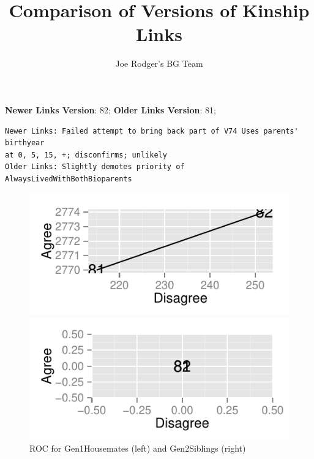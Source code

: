 \documentclass[a4paper]{article}\usepackage[]{graphicx}\usepackage[]{color}
\title{Comparison of Versions of Kinship Links}
\author{Joe Rodger's BG Team}
\makeatletter
\def\maxwidth{ %
  \ifdim\Gin@nat@width>\linewidth
    \linewidth
  \else
    \Gin@nat@width
  \fi
}
\newenvironment{kframe}{%
 \def\at@end@of@kframe{}%
 \ifinner\ifhmode%
  \def\at@end@of@kframe{\end{minipage}}%
  \begin{minipage}{\columnwidth}%
 \fi\fi%
 \def\FrameCommand##1{\hskip\@totalleftmargin \hskip-\fboxsep
 \colorbox{shadecolor}{##1}\hskip-\fboxsep
     \hskip-\linewidth \hskip-\@totalleftmargin \hskip\columnwidth}%
 \MakeFramed {\advance\hsize-\width
   \@totalleftmargin\z@ \linewidth\hsize
   \@setminipage}}%
 {\par\unskip\endMakeFramed%
 \at@end@of@kframe}
\newenvironment{knitrout}{}{} %
\makeatother
\begin{document}
\maketitle

\setlength{\parindent}{0pt}%







\textbf{Newer Links Version}: 82;
\textbf{Older Links Version}: 81;

\begin{knitrout}
\color{fgcolor}\begin{kframe}
\begin{verbatim}
Newer Links: Failed attempt to bring back part of V74 Uses parents' birthyear
at 0, 5, 15, +; disconfirms; unlikely
Older Links: Slightly demotes priority of AlwaysLivedWithBothBioparents
\end{verbatim}
\end{kframe}
\end{knitrout}


\begin{figure}[htbp]
\begin{knitrout}
\color{fgcolor}
\includegraphics[width=\maxwidth]{figure/unnamed-chunk-31} 

\includegraphics[width=\maxwidth]{figure/unnamed-chunk-32} 

\end{knitrout}

\caption{ROC for Gen1Housemates (left) and Gen2Siblings (right)}
\end{figure}
\end{document}
